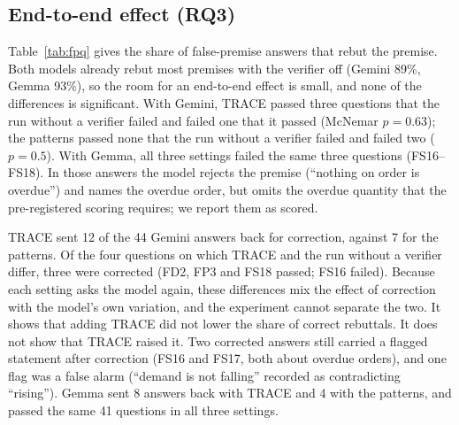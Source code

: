 \documentclass[journal]{IEEEtran}
\begin{document}
\subsection{End-to-end effect (RQ3)}
Table~\ref{tab:fpq} gives the share of false-premise answers that rebut the premise. Both models already
rebut most premises with the verifier off (Gemini 89\%, Gemma 93\%), so the room for an end-to-end effect is
small, and none of the differences is significant. With Gemini, TRACE passed three questions that the run
without a verifier failed and failed one that it passed (McNemar $p=0.63$); the patterns passed none that
the run without a verifier failed and failed two ($p=0.5$). With Gemma, all three settings failed the same
three questions (FS16--FS18). In those answers the model rejects the premise (``nothing on order is
overdue'') and names the overdue order, but omits the overdue quantity that the pre-registered scoring
requires; we report them as scored.

TRACE sent 12 of the 44 Gemini answers back for correction, against 7 for the patterns. Of the four
questions on which TRACE and the run without a verifier differ, three were corrected (FD2, FP3 and FS18
passed; FS16 failed). Because each setting asks the model again, these differences mix the effect of
correction with the model's own variation, and the experiment cannot separate the two. It shows that adding
TRACE did not lower the share of correct rebuttals. It does not show that TRACE raised it. Two corrected
answers still carried a flagged statement after correction (FS16 and FS17, both about overdue orders), and
one flag was a false alarm (``demand is not falling'' recorded as contradicting ``rising''). Gemma sent 8
answers back with TRACE and 4 with the patterns, and passed the same 41 questions in all three settings.
\end{document}
